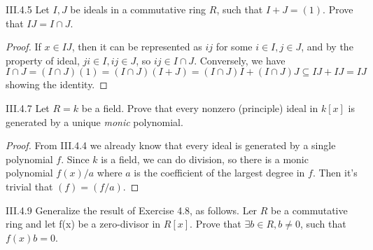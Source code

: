 \begin{problem}{III.4.5}
Let $I, J$ be ideals in a commutative ring $R$, such that $I+J = (1)$. Prove that $IJ = I \cap J$.
\end{problem}
\begin{proof}
If $x \in IJ$, then it can be represented as $ij$ for some $i \in I, j \in J$, and by the property of ideal, $ji \in I, ij \in J$, so $ij \in I \cap J$. Conversely, we have
\[
I \cap J = (I \cap J) (1) = (I\cap J)(I+J) = (I \cap J)I + (I \cap J)J \subseteq IJ + IJ = IJ
\]
showing the identity.
\end{proof}

\begin{problem}{III.4.7}
Let $R = k$ be a field. Prove that every nonzero (principle) ideal in $k[x]$ is generated by a unique \emph{monic} polynomial.
\end{problem}
\begin{proof}
From III.4.4 we already know that every ideal is generated by a single polynomial $f$. Since $k$ is a field, we can do division, so there is a monic polynomial $f(x)/a$ where $a$ is the coefficient of the largest degree in $f$. Then it's trivial that $(f) = (f/a)$.
\end{proof}

\begin{problem}{III.4.9}
Generalize the result of Exercise 4.8, as follows. Ler $R$ be a
commutative ring and let f(x) be a zero-divisor in $R[x]$. Prove that
$\exists b \in R, b \neq 0$, such that $f(x)b = 0$.
\end{problem}
